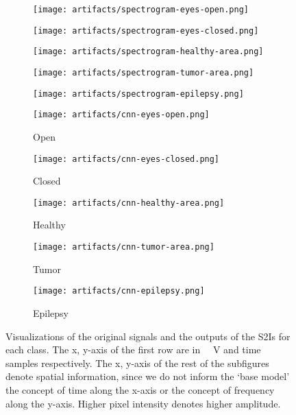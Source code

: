 \documentclass[conference]{IEEEtran}
\begin{document}
\begin{figure*}[!t]
	\begin{subfigure}{0.19\linewidth}
		\centering
		\texttt{[image: artifacts/spectrogram-eyes-open.png]}
	\end{subfigure}
	\begin{subfigure}{0.19\linewidth}
		\centering
		\texttt{[image: artifacts/spectrogram-eyes-closed.png]}
	\end{subfigure}
	\begin{subfigure}{0.19\linewidth}
		\centering
		\texttt{[image: artifacts/spectrogram-healthy-area.png]}
	\end{subfigure}
	\begin{subfigure}{0.19\linewidth}
		\centering
		\texttt{[image: artifacts/spectrogram-tumor-area.png]}
	\end{subfigure}
	\begin{subfigure}{0.19\linewidth}
		\centering
		\texttt{[image: artifacts/spectrogram-epilepsy.png]}
	\end{subfigure}

	\begin{subfigure}{0.19\linewidth}
		\centering
		\texttt{[image: artifacts/cnn-eyes-open.png]}
		\caption{Open}
	\end{subfigure}
	\begin{subfigure}{0.19\linewidth}
		\centering
		\texttt{[image: artifacts/cnn-eyes-closed.png]}
		\caption{Closed}
	\end{subfigure}
	\begin{subfigure}{0.19\linewidth}
		\centering
		\texttt{[image: artifacts/cnn-healthy-area.png]}
		\caption{Healthy}
	\end{subfigure}
	\begin{subfigure}{0.19\linewidth}
		\centering
		\texttt{[image: artifacts/cnn-tumor-area.png]}
		\caption{Tumor}
	\end{subfigure}
	\begin{subfigure}{0.19\linewidth}
		\centering
		\texttt{[image: artifacts/cnn-epilepsy.png]}
		\caption{Epilepsy}
	\end{subfigure}
	\caption{Visualizations of the original signals and the outputs of the S2Is for each class.
	The x, y-axis of the first row are in \SI{}{\micro{} V} and time samples respectively.
	The x, y-axis of the rest of the subfigures denote spatial information, since we do not inform the `base model' the concept of time along the x-axis or the concept of frequency along the y-axis.
	Higher pixel intensity denotes higher amplitude.}\label{fig:signal2imageoutputs}
\end{figure*}
\end{document}
